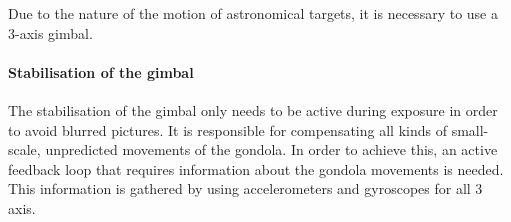 Due to the nature of the motion of astronomical targets, it is necessary to use a 3-axis gimbal.

\paragraph{Stabilisation of the gimbal}
The stabilisation of the gimbal only needs to be active during exposure in order to avoid blurred pictures. It is responsible for compensating all kinds of small-scale, unpredicted movements of the gondola. In order to achieve this, an active feedback loop that requires information about the gondola movements is needed. This information is gathered by using accelerometers and gyroscopes for all 3 axis. 


\raggedbottom
